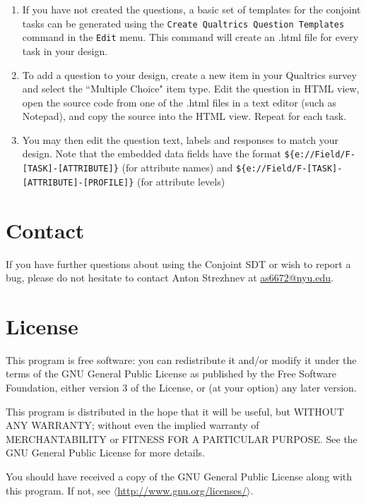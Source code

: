 \documentclass[12pt]{article}
\begin{document}
\begin{enumerate}
\item If you have not created the questions, a basic set of templates for the conjoint tasks can be generated using the \texttt{Create Qualtrics Question Templates} command in the \texttt{Edit} menu. This command will create an .html file for every task in your design.
\item To add a question to your design, create a new item in your Qualtrics survey and select the ``Multiple Choice" item type. Edit the question in HTML view, open the source code from one of the .html files in a text editor (such as Notepad), and copy the source into the HTML view. Repeat for each task.
\item You may then edit the question text, labels and responses to match your design. Note that the embedded data fields have the format \texttt{\$\{e://Field/F-[TASK]-[ATTRIBUTE]\}} (for attribute names) and \texttt{\$\{e://Field/F-[TASK]-[ATTRIBUTE]-[PROFILE]\}} (for attribute levels)

\end{enumerate}

\section{Contact}

If you have further questions about using the Conjoint SDT or wish to report a bug, please do not hesitate to contact Anton Strezhnev at \href{mailto:as6672@nyu.edu}{as6672@nyu.edu}.

\section{License}

This program is free software: you can redistribute it and/or modify it under the terms of the GNU General Public License as published by the Free Software Foundation, either version 3 of the License, or (at your option) any later version.

This program is distributed in the hope that it will be useful, but WITHOUT ANY WARRANTY; without even the implied warranty of MERCHANTABILITY or FITNESS FOR A PARTICULAR PURPOSE. See the GNU General Public License for more details.

You should have received a copy of the GNU General Public License along with this program.  If not, see $\langle$\href{http://www.gnu.org/licenses/}{http://www.gnu.org/licenses/}$\rangle$.


\clearpage


\end{document}
